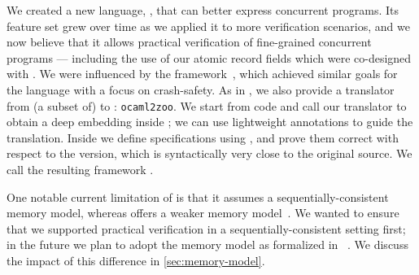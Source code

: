 We created a new \Iris language, \ZooLang, that can better express concurrent \OCaml programs. Its feature set grew over time as we applied it to more verification scenarios, and we now believe that it allows practical verification of fine-grained concurrent \OCamlFive programs --- including the use of our atomic record fields which were co-designed with \ZooLang.
We were influenced by the \Perennial framework~\citep*{DBLP:conf/sosp/ChajedTKZ19}, which achieved similar goals for the \Go language with a focus on crash-safety.
As in \Perennial, we also provide a translator from (a subset of) \OCaml to \ZooLang: \texttt{ocaml2zoo}. We start from \OCaml code and call our translator to obtain a deep \ZooLang embedding inside \Rocq; we can use lightweight annotations to guide the translation. Inside \Rocq we define specifications using \Iris, and prove them correct with respect to the \ZooLang version, which is syntactically very close to the original \OCaml source.
We call the resulting framework \Zoo.

One notable current limitation of \ZooLang is that it assumes a sequentially-consistent memory model, whereas \OCaml offers a weaker memory model~\citep*{ocaml-memory-model}. We wanted to ensure that we supported practical verification in a sequentially-consistent setting first; in the future we plan to adopt the \OCaml memory model as formalized in \Cosmo~\citep*{DBLP:journals/pacmpl/MevelJP20}. We discuss the impact of this difference in \cref{sec:memory-model}.


